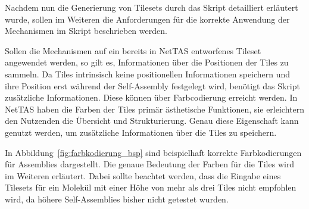 Nachdem nun die Generierung von Tilesets durch das Skript detailliert erläutert wurde, sollen im Weiteren die Anforderungen für die korrekte Anwendung der Mechanismen im Skript beschrieben werden. 

Sollen die Mechanismen auf ein bereits in NetTAS entworfenes Tileset angewendet werden, so gilt es, Informationen über die Positionen der Tiles zu sammeln. Da Tiles intrinsisch keine positionellen Informationen speichern und ihre Position erst während der Self-Assembly festgelegt wird, benötigt das Skript zusätzliche Informationen. Diese können über Farbcodierung erreicht werden. In NetTAS haben die Farben der Tiles primär ästhetische Funktionen, sie erleichtern den Nutzenden die Übersicht und Strukturierung. Genau diese Eigenschaft kann genutzt werden, um zusätzliche Informationen über die Tiles zu speichern.

In Abbildung~\ref{fig:farbkodierung_bsp} sind beispielhaft korrekte Farbkodierungen für Assemblies dargestellt. Die genaue Bedeutung der Farben für die Tiles wird im Weiteren erläutert. Dabei sollte beachtet werden, dass die Eingabe eines Tilesets für ein Molekül mit einer Höhe von mehr als drei Tiles nicht empfohlen wird, da höhere Self-Assemblies bisher nicht getestet wurden.

